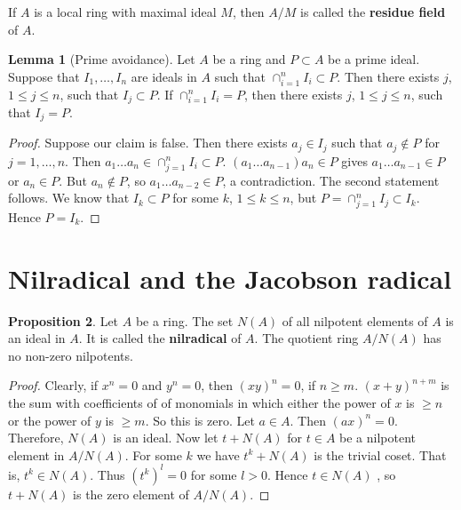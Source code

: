 \documentclass{article}
\newcommand{\rb}[1]{\left( #1 \right)}
\theoremstyle{definition}\newtheorem{definition}{Definition}[section]
\theoremstyle{definition}\newtheorem{remark}[definition]{Remark}
\theoremstyle{definition}\newtheorem*{example}{Example}
\theoremstyle{definition}\newtheorem*{note}{Note}
\newtheorem{proposition}[definition]{Proposition}
\newtheorem{lemma}[definition]{Lemma}
\begin{document}
If $ A $ is a local ring with maximal ideal $ M $, then $ A / M $ is called the \textbf{residue field} of $ A $.

\begin{lemma}[Prime avoidance]
Let $ A $ be a ring and $ P \subset A $ be a prime ideal. Suppose that $ I_1, \dots, I_n $ are ideals in $ A $ such that $ \cap_{i = 1}^n I_i \subset P $. Then there exists $ j $, $ 1 \le j \le n $, such that $ I_j \subset P $. If $ \cap_{i = 1}^n I_i = P $, then there exists $ j $, $ 1 \le j \le n $, such that $ I_j = P $.
\end{lemma}

\begin{proof}
Suppose our claim is false. Then there exists $ a_j \in I_j $ such that $ a_j \notin P $ for $ j = 1, \dots, n $. Then $ a_1 \dots a_n \in \cap_{j = 1}^n I_i \subset P $. $ \rb{a_1 \dots a_{n - 1}}a_n \in P $ gives $ a_1 \dots a_{n - 1} \in P $ or $ a_n \in P $. But $ a_n \notin P $, so $ a_1 \dots a_{n - 2} \in P $, a contradiction. The second statement follows. We know that $ I_k \subset P $ for some $ k $, $ 1 \le k \le n $, but $ P = \cap_{j = 1}^n I_j \subset I_k $. Hence $ P = I_k $.
\end{proof}


\section{Nilradical and the Jacobson radical}

\begin{proposition}
Let $ A $ be a ring. The set $ N\rb{A} $ of all nilpotent elements of $ A $ is an ideal in $ A $. It is called the \textbf{nilradical} of $ A $. The quotient ring $ A / N\rb{A} $ has no non-zero nilpotents.
\end{proposition}

\begin{proof}
Clearly, if $ x^n = 0 $ and $ y^n = 0 $, then $ \rb{xy}^n = 0 $, if $ n \ge m $. $ \rb{x + y}^{n + m} $ is the sum with coefficients of of monomials in which either the power of $ x $ is $ \ge n $ or the power of $ y $ is $ \ge m $. So this is zero. Let $ a \in A $. Then $ \rb{ax}^n = 0 $. Therefore, $ N\rb{A} $ is an ideal. Now let $ t + N\rb{A} $ for $ t \in A $ be a nilpotent element in $ A / N\rb{A} $. For some $ k $ we have $ t^k + N\rb{A} $ is the trivial coset. That is, $ t^k \in N\rb{A} $. Thus $ \rb{t^k}^l = 0 $ for some $ l > 0 $. Hence $ t \in N\rb{A} $ , so $ t + N\rb{A} $ is the zero element of $ A / N\rb{A} $.
\end{proof}
\end{document}
